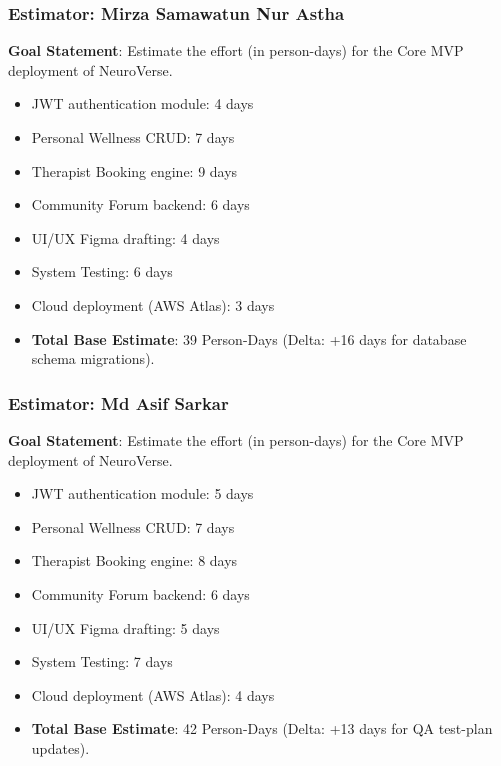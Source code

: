 \documentclass[a4paper,11pt]{report}
\begin{document}
\subsubsection{Estimator: Mirza Samawatun Nur Astha}
\textbf{Goal Statement}: Estimate the effort (in person-days) for the Core MVP deployment of NeuroVerse.
\begin{itemize}
    \item JWT authentication module: 4 days
    \item Personal Wellness CRUD: 7 days
    \item Therapist Booking engine: 9 days
    \item Community Forum backend: 6 days
    \item UI/UX Figma drafting: 4 days
    \item System Testing: 6 days
    \item Cloud deployment (AWS Atlas): 3 days
    \item \textbf{Total Base Estimate}: 39 Person-Days (Delta: +16 days for database schema migrations).
\end{itemize}

\subsubsection{Estimator: Md Asif Sarkar}
\textbf{Goal Statement}: Estimate the effort (in person-days) for the Core MVP deployment of NeuroVerse.
\begin{itemize}
    \item JWT authentication module: 5 days
    \item Personal Wellness CRUD: 7 days
    \item Therapist Booking engine: 8 days
    \item Community Forum backend: 6 days
    \item UI/UX Figma drafting: 5 days
    \item System Testing: 7 days
    \item Cloud deployment (AWS Atlas): 4 days
    \item \textbf{Total Base Estimate}: 42 Person-Days (Delta: +13 days for QA test-plan updates).
\end{itemize}
\end{document}
